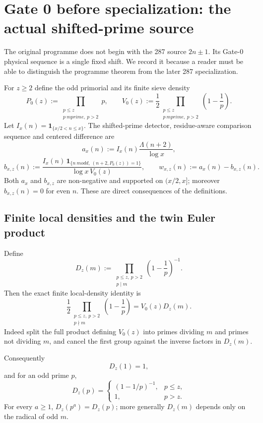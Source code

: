 \documentclass[11pt]{article}
\theoremstyle{definition}
\theoremstyle{remark}
\newcommand{\1}{\mathbf 1}
\begin{document}
\section{Gate 0 before specialization: the actual shifted-prime source}
\label{sec:g0-actual}

The original programme does not begin with the 287 source $2n\pm1$.  Its Gate-0 physical sequence is a
single fixed shift.  We record it because a reader must be able to distinguish the programme theorem from the
later 287 specialization.

For $z\ge2$ define the odd primorial and its finite sieve density
\[
 P_0(z):=\prod_{\substack{p\le z\\p\ {
m prime},\ p>2}}p,
 \qquad
 V_0(z):=\frac12\prod_{\substack{p\le z\\p\ {
m prime},\ p>2}}\left(1-\frac1p\right).
\tag{G0-1}
\]
Let $I_x(n)=\1_{\{x/2<n\le x\}}$.  The shifted-prime detector, residue-aware comparison sequence and centered
difference are
\[
 a_x(n):=I_x(n)\frac{\Lambda(n+2)}{\log x},
\tag{G0-2}
\]
\[
 b_{x,z}(n):=
 \frac{I_x(n)\,\1_{\{n\ {
m odd},\ (n+2,P_0(z))=1\}}}{\log x\,V_0(z)},
 \qquad
 w_{x,z}(n):=a_x(n)-b_{x,z}(n).
\tag{G0-3}
\]
Both $a_x$ and $b_{x,z}$ are non-negative and supported on $(x/2,x]$; moreover $b_{x,z}(n)=0$ for even $n$.
These are direct consequences of the definitions.

\subsection{Finite local densities and the twin Euler product}

Define
\[
 D_z(m):=\prod_{\substack{p\le z,\ p>2\\p\mid m}}
 \left(1-\frac1p\right)^{-1}.
\tag{G0-4}
\]
Then the exact finite local-density identity is
\[
 \boxed{
 \frac12\prod_{\substack{p\le z,\ p>2\\p\nmid m}}
 \left(1-\frac1p\right)=V_0(z)D_z(m).}
\tag{G0-5}
\]
Indeed split the full product defining $V_0(z)$ into primes dividing $m$ and primes not dividing $m$, and cancel
the first group against the inverse factors in $D_z(m)$.

Consequently
\[
 D_z(1)=1,
\tag{G0-6}
\]
and for an odd prime $p$,
\[
 D_z(p)=
 \begin{cases}
 (1-1/p)^{-1},&p\le z,\\
 1,&p>z.
 \end{cases}
\tag{G0-7}
\]
For every $a\ge1$, $D_z(p^a)=D_z(p)$; more generally $D_z(m)$ depends only on the radical of odd $m$.
\end{document}

